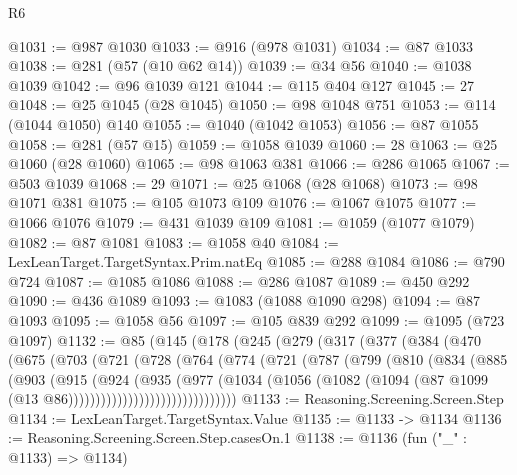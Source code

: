 \begin{lexlean}{R6}
\begin{coremodule}
@1031 := @987 @1030
@1033 := @916 (@978 @1031)
@1034 := @87 @1033
@1038 := @281 (@57 (@10 @62 @14))
@1039 := @34 @56
@1040 := @1038 @1039
@1042 := @96 @1039 @121
@1044 := @115 @404 @127
@1045 := 27
@1048 := @25 @1045 (@28 @1045)
@1050 := @98 @1048 @751
@1053 := @114 (@1044 @1050) @140
@1055 := @1040 (@1042 @1053)
@1056 := @87 @1055
@1058 := @281 (@57 @15)
@1059 := @1058 @1039
@1060 := 28
@1063 := @25 @1060 (@28 @1060)
@1065 := @98 @1063 @381
@1066 := @286 @1065
@1067 := @503 @1039
@1068 := 29
@1071 := @25 @1068 (@28 @1068)
@1073 := @98 @1071 @381
@1075 := @105 @1073 @109
@1076 := @1067 @1075
@1077 := @1066 @1076
@1079 := @431 @1039 @109
@1081 := @1059 (@1077 @1079)
@1082 := @87 @1081
@1083 := @1058 @40
@1084 := LexLeanTarget.TargetSyntax.Prim.natEq
@1085 := @288 @1084
@1086 := @790 @724
@1087 := @1085 @1086
@1088 := @286 @1087
@1089 := @450 @292
@1090 := @436 @1089
@1093 := @1083 (@1088 @1090 @298)
@1094 := @87 @1093
@1095 := @1058 @56
@1097 := @105 @839 @292
@1099 := @1095 (@723 @1097)
@1132 := @85
    (@145
      (@178
        (@245
          (@279
            (@317
              (@377
                (@384
                  (@470
                    (@675
                      (@703
                        (@721
                          (@728
                            (@764
                              (@774
                                (@721
                                  (@787
                                    (@799
                                      (@810
                                        (@834
                                          (@885
                                            (@903
                                              (@915
                                                (@924
                                                  (@935
                                                    (@977
                                                      (@1034
                                                        (@1056
                                                          (@1082
                                                            (@1094
                                                              (@87
                                                                @1099
                                                                (@13
                                                                  @86)))))))))))))))))))))))))))))))
@1133 := Reasoning.Screening.Screen.Step
@1134 := LexLeanTarget.TargetSyntax.Value
@1135 := @1133 -> @1134
@1136 := Reasoning.Screening.Screen.Step.casesOn.{1}
@1138 := @1136 (fun ("_" : @1133) => @1134)

\end{coremodule}
\end{lexlean}
